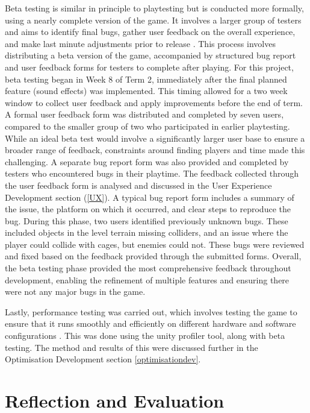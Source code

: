 \documentclass[10pt]{final_report}
\begin{document}
Beta testing is similar in principle to playtesting but is conducted more formally, using a nearly complete version of the game. It involves a larger group of testers and aims to identify final bugs, gather user feedback on the overall experience, and make last minute adjustments prior to release \cite{flashjungle_2022}. This process involves distributing a beta version of the game, accompanied by structured bug report and user feedback forms for testers to complete after playing. For this project, beta testing began in Week 8 of Term 2, immediately after the final planned feature (sound effects) was implemented. This timing allowed for a two week window to collect user feedback and apply improvements before the end of term. A formal user feedback form was distributed and completed by seven users, compared to the smaller group of two who participated in earlier playtesting. While an ideal beta test would involve a significantly larger user base to ensure a broader range of feedback, constraints around finding players and time made this challenging. A separate bug report form was also provided and completed by testers who encountered bugs in their playtime. The feedback collected through the user feedback form is analysed and discussed in the User Experience Development section (\ref{UX}). A typical bug report form includes a summary of the issue, the platform on which it occurred, and clear steps to reproduce the bug. During this phase, two users identified previously unknown bugs. These included objects in the level terrain missing colliders, and an issue where the player could collide with cages, but enemies could not. These bugs were reviewed and fixed based on the feedback provided through the submitted forms. Overall, the beta testing phase provided the most comprehensive feedback throughout development, enabling the refinement of multiple features and ensuring there were not any major bugs in the game. \newline

Lastly, performance testing was carried out, which involves testing the game to ensure that it runs smoothly and efficiently on different hardware and software configurations \cite{UnityTesting}. This was done using the unity profiler tool, along with beta testing. The method and results of this were discussed further in the Optimisation Development section \ref{optimisationdev}.  

\chapter{Reflection and Evaluation}\label{reflection}
\end{document}
